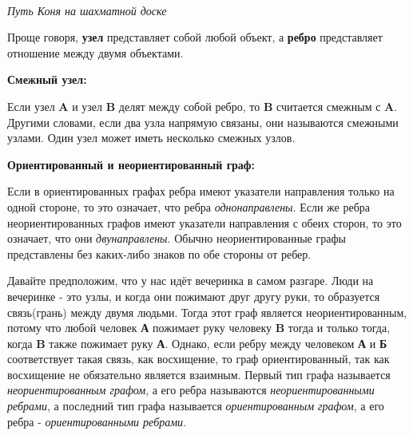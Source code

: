 
\begin{center}
	 \\
	\textit{Путь Коня на шахматной доске}
\end{center}

Проще говоря, \textbf{узел} представляет собой любой объект, а \textbf{ребро} представляет отношение между двумя объектами.

\vspace{\baselineskip}

\textbf{Смежный узел:}

\vspace{\baselineskip}

Если узел \textbf{A} и узел \textbf{B} делят между собой ребро, то \textbf{B} считается смежным с \textbf{A}. Другими словами, если два узла напрямую связаны, они называются смежными узлами. Один узел может иметь несколько смежных узлов.

\vspace{\baselineskip}

\textbf{Ориентированный и неориентированный граф:}

\vspace{\baselineskip}

Если в ориентированных графах ребра имеют указатели направления только на одной стороне, то это означает, что ребра \textit{однонаправлены}. Если же ребра неориентированных графов имеют указатели направления с обеих сторон, то это означает, что они \textit{двунаправлены}. Обычно неориентированные графы представлены без каких-либо знаков по обе стороны от ребер.

\vspace{\baselineskip}

Давайте предположим, что у нас идёт вечеринка в самом разгаре. Люди на вечеринке - это узлы, и когда они пожимают друг другу руки, то образуется связь(грань) между двумя людьми. Тогда этот граф является неориентированным, потому что любой человек \textbf{А} пожимает руку человеку \textbf{B} тогда и только тогда, когда \textbf{B} также пожимает руку \textbf{А}. Однако, если ребру между человеком \textbf{А} и \textbf{Б} соответствует такая связь, как восхищение, то граф ориентированный, так как восхищение не обязательно является взаимным. Первый тип графа называется \textit{неориентированным графом}, а его ребра называются \textit{неориентированными ребрами}, а последний тип графа называется \textit{ориентированным графом}, а его ребра - \textit{ориентированными ребрами}.

